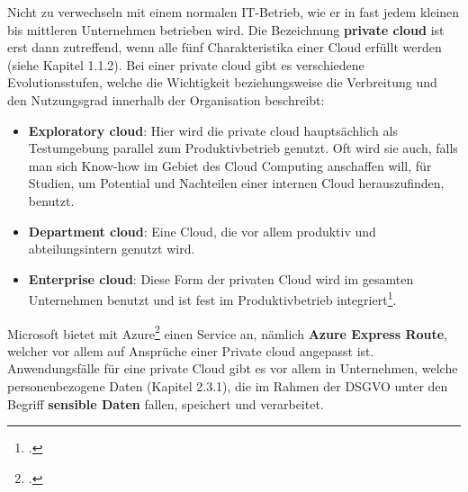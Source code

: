 Nicht zu verwechseln mit einem normalen IT-Betrieb, wie er in fast jedem kleinen bis mittleren Unternehmen betrieben wird. Die Bezeichnung \textbf{private cloud} ist erst dann zutreffend, wenn alle fünf Charakteristika einer Cloud erfüllt werden (siehe Kapitel 1.1.2).
Bei einer private cloud gibt es verschiedene Evolutionsstufen, welche die Wichtigkeit beziehungsweise die Verbreitung und den Nutzungsgrad innerhalb der Organisation beschreibt:
\begin{itemize}
	\item \textbf{Exploratory cloud}: Hier wird die private cloud hauptsächlich als Testumgebung parallel zum Produktivbetrieb genutzt. Oft wird sie auch, falls man sich Know-how im Gebiet des Cloud Computing anschaffen will, für Studien, um Potential und Nachteilen einer internen Cloud herauszufinden, benutzt.
	\item \textbf{Department cloud}: Eine Cloud, die vor allem produktiv und abteilungsintern genutzt wird.
	\item \textbf{Enterprise cloud}: Diese Form der privaten Cloud wird im gesamten Unternehmen benutzt und ist fest im Produktivbetrieb integriert\footcite{Lehrunterlagen-HTL-cloud}.
\end{itemize}

Microsoft bietet mit Azure\footcite{cloud-ms-privat} einen Service an, nämlich \textbf{Azure Express Route}, welcher vor allem auf Ansprüche einer Private cloud angepasst ist.
Anwendungsfälle für eine private Cloud gibt es vor allem in Unternehmen, welche personenbezogene Daten (Kapitel 2.3.1), die im Rahmen der DSGVO unter den Begriff \textbf{sensible Daten} fallen, speichert und verarbeitet.

